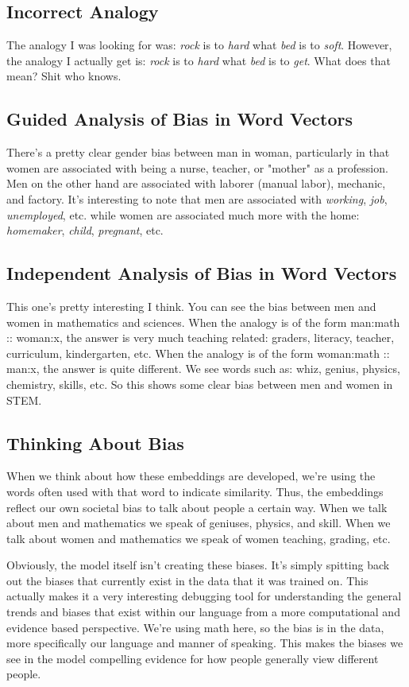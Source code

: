 \documentclass[12pt]{article}
\begin{document}
\subsection{Incorrect Analogy}
The analogy I was looking for was: \emph{rock} is to \emph{hard} what \emph{bed} is to \emph{soft}. 
However, the analogy I actually get is: \emph{rock} is to \emph{hard} what \emph{bed} is to \emph{get}.
What does that mean? Shit who knows. 

\subsection{Guided Analysis of Bias in Word Vectors}
There's a pretty clear gender bias between man in woman, particularly in that women are associated
with being a nurse, teacher, or "mother" as a profession. Men on the other hand are associated 
with laborer (manual labor), mechanic, and factory. It's interesting to note that men are associated 
with \emph{working}, \emph{job}, \emph{unemployed}, etc. while women are associated much more 
with the home: \emph{homemaker}, \emph{child}, \emph{pregnant}, etc. 

\subsection{Independent Analysis of Bias in Word Vectors}
This one's pretty interesting I think. You can see the bias between men and women in mathematics 
and sciences. When the analogy is of the form man:math :: woman:x, the answer is very much 
teaching related: graders, literacy, teacher, curriculum, kindergarten, etc. When the analogy is 
of the form woman:math :: man:x, the answer is quite different. We see words such as: whiz, genius, 
physics, chemistry, skills, etc. So this shows some clear bias between men and women in STEM. 

\subsection{Thinking About Bias}
When we think about how these embeddings are developed, we're using the words often used with that
word to indicate similarity. Thus, the embeddings reflect our own societal bias to talk about people
a certain way. When we talk about men and mathematics we speak of geniuses, physics, and skill. When 
we talk about women and mathematics we speak of women teaching, grading, etc.

Obviously, the model itself isn't creating these biases. It's simply spitting back out the biases 
that currently exist in the data that it was trained on. This actually makes it a very interesting 
debugging tool for understanding the general trends and biases that exist within our language from 
a more computational and evidence based perspective. We're using math here, so the bias is in the data, 
more specifically our language and manner of speaking. This makes the biases we see in the model 
compelling evidence for how people generally view different people. 
\end{document}
